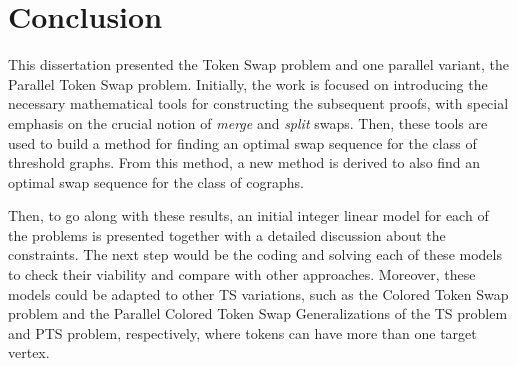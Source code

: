\documentclass[msc,english,table,xcdraw]{ppgccufmg}
\begin{document}

\chapter{Conclusion}

This dissertation presented the Token Swap problem and one parallel variant, 
the Parallel Token Swap problem.
Initially, the work is focused on introducing the necessary mathematical tools
for constructing the subsequent proofs, with special emphasis on the crucial 
notion of \textit{merge} and \textit{split} swaps.
Then, these tools are used to build a method for finding an optimal
swap sequence for the class of threshold graphs.
From this method, a new method is derived to also find an optimal swap sequence
for the class of cographs.

Then, to go along with these results, an initial integer linear model for each
of the problems is presented together with a detailed discussion about the 
constraints.
The next step would be the coding and solving each of these models to 
check their viability and compare with other approaches.
Moreover, these models could be adapted to other TS variations, such as the 
Colored Token Swap problem and the Parallel Colored Token Swap
Generalizations of the TS problem and PTS problem, respectively, where tokens
can have more than one target vertex.

\end{document}
